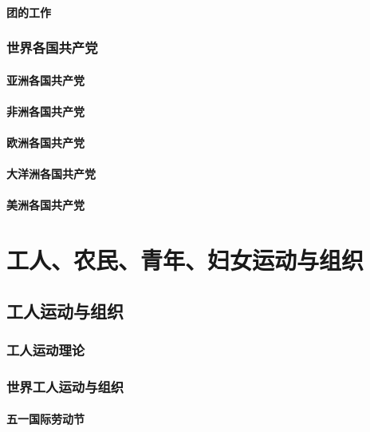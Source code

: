 \documentclass[UTF8]{../RepresentationUniverse}
\begin{document}
        \subsubsection{团的工作}
    
    \subsection{世界各国共产党}
        \subsubsection{亚洲各国共产党}
        \subsubsection{非洲各国共产党}
        \subsubsection{欧洲各国共产党}
        \subsubsection{大洋洲各国共产党}
        \subsubsection{美洲各国共产党}









\chapter{工人、农民、青年、妇女运动与组织}

\section{工人运动与组织}
\subsection{工人运动理论}
\subsection{世界工人运动与组织}
    \subsubsection{五一国际劳动节}
\end{document}
